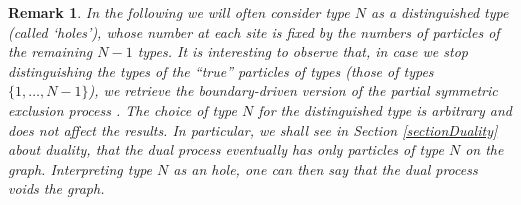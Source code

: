 \documentclass[10pt]{article}
\numberwithin{equation}{section}
\numberwithin{equation}{subsection}
\newtheorem{remark}{Remark}
\begin{document}
\noindent
\begin{remark}
\label{hole}
In the following we will often consider type $N$ as a distinguished type
(called `holes'), whose number at each site is fixed by the numbers of particles 
of the remaining $N-1$ types. It is interesting to observe that, in case we stop distinguishing the types of the ``true'' particles of types 
(those of types $\{1,\ldots,N-1\}$), we retrieve the 
boundary-driven version of the partial symmetric exclusion process \cite{schutzSandow,carinci2013duality}.
The choice of type $N$ for the distinguished type is arbitrary and does not affect
the results. In particular, we shall see in Section \ref{sectionDuality} about duality, that
the dual process eventually has only particles of type $N$ on the graph.
Interpreting type $N$ as an hole, one can then say that the dual process voids the graph.  
\end{remark}
\end{document}
